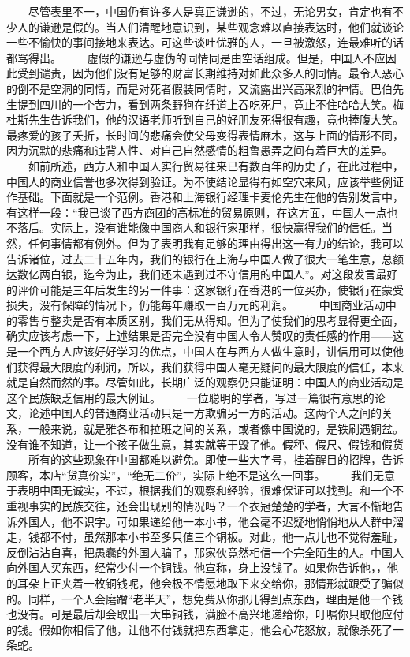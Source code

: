 \documentclass[12pt,oneside]{book}
\begin{document}
\begin{common-format}
　　尽管表里不一，中国仍有许多人是真正谦逊的，不过，无论男女，肯定也有不少人的谦逊是假的。当人们清醒地意识到，某些观念难以直接表达时，他们就谈论一些不愉快的事间接地来表达。可这些谈吐优雅的人，一旦被激怒，连最难听的话都骂得出。 
　　虚假的谦逊与虚伪的同情同是由空话组成。但是，中国人不应因此受到谴责，因为他们没有足够的财富长期维持对如此众多人的同情。最令人恶心的倒不是空洞的同情，而是对死者假装同情时，又流露出兴高采烈的神情。巴伯先生提到四川的一个苦力，看到两条野狗在纤道上吞吃死尸，竟止不住哈哈大笑。梅杜斯先生告诉我们，他的汉语老师听到自己的好朋友死得很有趣，竟也捧腹大笑。最疼爱的孩子夭折，长时间的悲痛会使父母变得表情麻木，这与上面的情形不同，因为沉默的悲痛和违背人性、对自己自然感情的粗鲁愚弄之间有着巨大的差异。 
　　如前所述，西方人和中国人实行贸易往来已有数百年的历史了，在此过程中，中国人的商业信誉也多次得到验证。为不使结论显得有如空穴来风，应该举些例证作基础。下面就是一个范例。香港和上海银行经理卡麦伦先生在他的告别发言中，有这样一段：“我已谈了西方商团的高标准的贸易原则，在这方面，中国人一点也不落后。实际上，没有谁能像中国商人和银行家那样，很快赢得我们的信任。当然，任何事情都有例外。但为了表明我有足够的理由得出这一有力的结论，我可以告诉诸位，过去二十五年内，我们的银行在上海与中国人做了很大一笔生意，总额达数亿两白银，迄今为止，我们还未遇到过不守信用的中国人”。对这段发言最好的评价可能是三年后发生的另一件事：这家银行在香港的一位买办，使银行在蒙受损失，没有保障的情况下，仍能每年赚取一百万元的利润。 
　　中国商业活动中的零售与整卖是否有本质区别，我们无从得知。但为了使我们的思考显得更全面，确实应该考虑一下，上述结果是否完全没有中国人令人赞叹的责任感的作用——这是一个西方人应该好好学习的优点，中国人在与西方人做生意时，讲信用可以使他们获得最大限度的利润，所以，我们获得中国人毫无疑问的最大限度的信任，本来就是自然而然的事。尽管如此，长期广泛的观察仍只能证明：中国人的商业活动是这个民族缺乏信用的最大例证。 
　　一位聪明的学者，写过一篇很有意思的论文，论述中国人的普通商业活动只是一方欺骗另一方的活动。这两个人之间的关系，一般来说，就是雅各布和拉班之间的关系，或者像中国说的，是铁刷遇铜盆。没有谁不知道，让一个孩子做生意，其实就等于毁了他。假秤、假尺、假钱和假货——所有的这些现象在中国都难以避免。即使一些大字号，挂着醒目的招牌，告诉顾客，本店“货真价实”，“绝无二价”，实际上绝不是这么一回事。 
　　我们无意于表明中国无诚实，不过，根据我们的观察和经验，很难保证可以找到。和一个不重视事实的民族交往，还会出现别的情况吗？一个衣冠楚楚的学者，大言不惭地告诉外国人，他不识字。可如果递给他一本小书，他会毫不迟疑地悄悄地从人群中溜走，钱都不付，虽然那本小书至多只值三个铜板。对此，他一点儿也不觉得羞耻，反倒沾沾自喜，把愚蠢的外国人骗了，那家伙竟然相信一个完全陌生的人。中国人向外国人买东西，经常少付一个铜钱。他宣称，身上没钱了。如果你告诉他，，他的耳朵上正夹着一枚铜钱呢，他会极不情愿地取下来交给你，那情形就跟受了骗似的。同样，一个人会磨蹭“老半天”，想免费从你那儿得到点东西，理由是他一个钱也没有。可是最后却会取出一大串铜钱，满脸不高兴地递给你，叮嘱你只取他应付的钱。假如你相信了他，让他不付钱就把东西拿走，他会心花怒放，就像杀死了一条蛇。 

\end{common-format}
\end{document}

